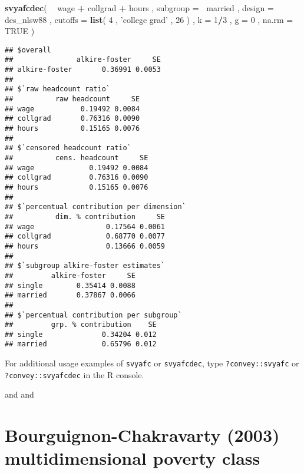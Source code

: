 \documentclass[]{book}
\newenvironment{Shaded}{\begin{snugshade}}{\end{snugshade}}
\newcommand{\DataTypeTok}[1]{\textcolor[rgb]{0.13,0.29,0.53}{#1}}
\newcommand{\DecValTok}[1]{\textcolor[rgb]{0.00,0.00,0.81}{#1}}
\newcommand{\KeywordTok}[1]{\textcolor[rgb]{0.13,0.29,0.53}{\textbf{#1}}}
\newcommand{\NormalTok}[1]{#1}
\newcommand{\OperatorTok}[1]{\textcolor[rgb]{0.81,0.36,0.00}{\textbf{#1}}}
\newcommand{\OtherTok}[1]{\textcolor[rgb]{0.56,0.35,0.01}{#1}}
\newcommand{\StringTok}[1]{\textcolor[rgb]{0.31,0.60,0.02}{#1}}
\begin{document}
\begin{Shaded}
\begin{Highlighting}[]
\KeywordTok{svyafcdec}\NormalTok{(}
    \OperatorTok{~}\StringTok{ }\NormalTok{wage }\OperatorTok{+}\StringTok{ }\NormalTok{collgrad }\OperatorTok{+}\StringTok{ }\NormalTok{hours , }
    \DataTypeTok{subgroup =} \OperatorTok{~}\NormalTok{married , }
    \DataTypeTok{design =}\NormalTok{ des_nlsw88 , }
    \DataTypeTok{cutoffs =} \KeywordTok{list}\NormalTok{( }\DecValTok{4}\NormalTok{ , }\StringTok{'college grad'}\NormalTok{ , }\DecValTok{26}\NormalTok{ ) , }
    \DataTypeTok{k =} \DecValTok{1}\OperatorTok{/}\DecValTok{3}\NormalTok{ , }
    \DataTypeTok{g =} \DecValTok{0}\NormalTok{ ,}
    \DataTypeTok{na.rm =} \OtherTok{TRUE}
\NormalTok{)}
\end{Highlighting}
\end{Shaded}

\begin{verbatim}
## $overall
##               alkire-foster     SE
## alkire-foster       0.36991 0.0053
## 
## $`raw headcount ratio`
##          raw headcount     SE
## wage           0.19492 0.0084
## collgrad       0.76316 0.0090
## hours          0.15165 0.0076
## 
## $`censored headcount ratio`
##          cens. headcount     SE
## wage             0.19492 0.0084
## collgrad         0.76316 0.0090
## hours            0.15165 0.0076
## 
## $`percentual contribution per dimension`
##          dim. % contribution     SE
## wage                 0.17564 0.0061
## collgrad             0.68770 0.0077
## hours                0.13666 0.0059
## 
## $`subgroup alkire-foster estimates`
##         alkire-foster     SE
## single        0.35414 0.0088
## married       0.37867 0.0066
## 
## $`percentual contribution per subgroup`
##         grp. % contribution    SE
## single              0.34204 0.012
## married             0.65796 0.012
\end{verbatim}

For additional usage examples of \texttt{svyafc} or \texttt{svyafcdec}, type \texttt{?convey::svyafc} or \texttt{?convey::svyafcdec} in the R console.

\citep{alkire2011} and \citep{alkire2015} and \citep{pacifico2016}

\hypertarget{bourguignon-chakravarty-2003-multidimensional-poverty-class}{%
\section{Bourguignon-Chakravarty (2003) multidimensional poverty class}\label{bourguignon-chakravarty-2003-multidimensional-poverty-class}}
\end{document}
